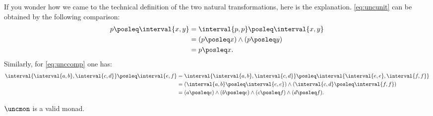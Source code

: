\begin{remark}
If you wonder how we came to the technical definition of the two natural transformations, here is the explanation. \cref{eq:uncunit} can be obtained by the following comparison:
\begin{equation*}
    \begin{aligned}
    p\posleq \interval{x,y} &= \interval{p,p}\posleq \interval{x,y}\\
    &= (p\posleq x)\wedge (p\posleq y)\\
    &= p\posleq x.
    \end{aligned}
\end{equation*}
Similarly, for \cref{eq:unccomp} one has:
\begin{equation*}
    \begin{aligned}
    \interval{\interval{a,b},\interval{c,d}}\posleq \interval{e,f}&= \interval{\interval{a,b},\interval{c,d}}\posleq\interval{\interval{e,e},\interval{f,f}}\\
    &=(\interval{a,b}\posleq \interval{e,e})\wedge (\interval{c,d}\posleq \interval{f,f})\\
    &=(a\posleq e)\wedge (b\posleq e)\wedge (c\posleq f)\wedge (d\posleq f).
    \end{aligned}
\end{equation*}
\end{remark}
\begin{lemma}
$\uncmon$ is a valid monad.
\end{lemma}
